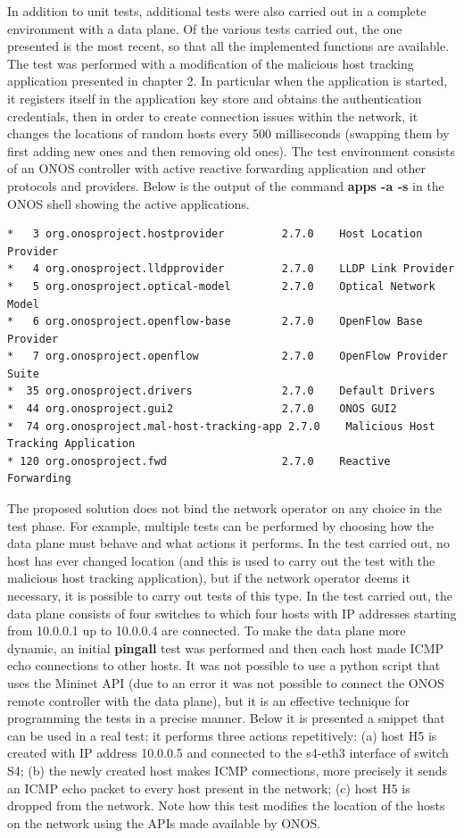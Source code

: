 In addition to unit tests, additional tests were also carried out in a complete environment with a data plane. Of the various tests carried out, the one presented is the most recent, so that all the implemented functions are available. The test was performed with a modification of the malicious host tracking application presented in chapter 2. In particular when the application is started, it registers itself in the application key store and obtains the authentication credentials, then in order to create connection issues within the network, it changes the locations of random hosts every 500 milliseconds (swapping them by first adding new ones and then removing old ones). The test environment consists of an ONOS controller with active reactive forwarding application and other protocols and providers. Below is the output of the command \textbf{apps -a -s} in the ONOS shell showing the active applications.
\begin{lstlisting}
*   3 org.onosproject.hostprovider         2.7.0    Host Location Provider
*   4 org.onosproject.lldpprovider         2.7.0    LLDP Link Provider
*   5 org.onosproject.optical-model        2.7.0    Optical Network Model
*   6 org.onosproject.openflow-base        2.7.0    OpenFlow Base Provider
*   7 org.onosproject.openflow             2.7.0    OpenFlow Provider Suite
*  35 org.onosproject.drivers              2.7.0    Default Drivers
*  44 org.onosproject.gui2                 2.7.0    ONOS GUI2
*  74 org.onosproject.mal-host-tracking-app 2.7.0    Malicious Host Tracking Application
* 120 org.onosproject.fwd                  2.7.0    Reactive Forwarding
\end{lstlisting}
The proposed solution does not bind the network operator on any choice in the test phase. For example, multiple tests can be performed by choosing how the data plane must behave and what actions it performs. In the test carried out, no host has ever changed location (and this is used to carry out the test with the malicious host tracking application), but if the network operator deems it necessary, it is possible to carry out tests of this type. In the test carried out, the data plane consists of four switches to which four hosts with IP addresses starting from 10.0.0.1 up to 10.0.0.4 are connected. To make the data plane more dynamic, an initial \textbf{pingall} test was performed and then each host made ICMP echo connections to other hosts. It was not possible to use a python script that uses the Mininet API (due to an error it was not possible to connect the ONOS remote controller with the data plane), but it is an effective technique for programming the tests in a precise manner. Below it is presented a snippet that can be used in a real test; it performs three actions repetitively: (a) host H5 is created with IP address 10.0.0.5 and connected to the s4-eth3 interface of switch S4; (b) the newly created host makes ICMP connections, more precisely it sends an ICMP echo packet to every host present in the network; (c) host H5 is dropped from the network. Note how this test modifies the location of the hosts on the network using the APIs made available by ONOS.
